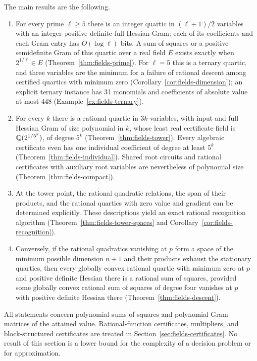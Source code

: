 The main results are the following.
\begin{enumerate}[label=(\alph*)]
\item For every prime $\ell\ge5$ there is an integer quartic in
  $(\ell+1)/2$ variables with an integer positive definite full Hessian Gram;
  each of its coefficients and each Gram entry has $O(\log\ell)$ bits. A sum
  of squares or a positive semidefinite Gram of this quartic over a real
  field $E$ exists exactly when $2^{1/\ell}\in E$
  (Theorem~\ref{thm:fields-prime}). For $\ell=5$ this is a
  ternary quartic, and three variables are the minimum for a failure of
  rational descent among certified quartics with minimum zero
  (Corollary~\ref{cor:fields-dimension}); an explicit ternary instance has 31
  monomials and coefficients of absolute value at most $448$
  (Example~\ref{ex:fields-ternary}).
\item For every $k$ there is a rational quartic in $3k$ variables, with input
  and full Hessian Gram of size polynomial in $k$, whose least real
  certificate field is $\mathbb Q(2^{1/5^k})$, of degree $5^k$
  (Theorem~\ref{thm:fields-tower}). Every algebraic certificate even has one
  individual coefficient of degree at least $5^k$
  (Theorem~\ref{thm:fields-individual}). Shared root circuits and rational
  certificates with auxiliary root variables are nevertheless of polynomial
  size (Theorem~\ref{thm:fields-compact}).
\item At the tower point, the rational quadratic relations, the span of their
  products, and the rational quartics with zero value and gradient can be
  determined explicitly. These descriptions yield an exact rational recognition
  algorithm (Theorem~\ref{thm:fields-tower-spaces} and
  Corollary~\ref{cor:fields-recognition}).
\item Conversely, if the rational quadratics vanishing at $p$ form a space of
  the minimum possible dimension $n+1$ and their products exhaust the
  stationary quartics, then every globally convex rational quartic with
  minimum zero at $p$ and positive definite Hessian there is a rational sum
  of squares, provided some globally convex rational sum of squares of
  degree four vanishes at $p$ with positive definite Hessian there
  (Theorem~\ref{thm:fields-descent}).
\end{enumerate}
All statements concern polynomial sums of squares and polynomial Gram
matrices of the attained value. Rational-function certificates, multipliers,
and block-structured certificates are treated in
Section~\ref{sec:fields-certificates}. No result of this section is a lower
bound for the complexity of a decision problem or for approximation.

